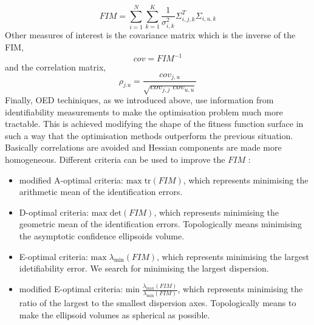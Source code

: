 \documentclass[a4paper, 11pt]{article}
\begin{document}
\begin{equation} \label{FIM}
FIM=\sum_{i=1}^{N}\sum_{k=1}^{K}\frac{1}{\sigma_{i,k}^{2}}\Sigma_{i,j,k}^{T}\Sigma_{i,u,k}
\end{equation}
Other measures of interest is the covariance matrix which is the inverse of the FIM, 
\begin{equation} \label{cov}
  cov=FIM^{-1}
\end{equation}
and the correlation matrix, 
\begin{equation} \label{corr}
  \rho_{j.u}=\frac{cov_{j,u}}{\sqrt{cov_{j,j}\;cov_{u,u}}}
\end{equation}
Finally, OED techiniques, as we introduced above, use information from identifiability measurements to make the optimisation problem much more tractable. 
This is achieved modifying the shape of the fitness function surface in such a way that the optimisation methods outperform the previous situation.
Basically correlations are avoided and Hessian components are made more homogeneous.
Different criteria can be used to improve the $FIM$ \citep{rodriguez-fernandez06}:
\begin{itemize}
  \item modified A-optimal criteria: $\mathrm{max}\;\mathrm{tr}(FIM)$, which represents minimising the arithmetic mean of the identification errors.
  \item D-optimal criteria: $\mathrm{max}\;\mathrm{det}(FIM)$, which represents minimising the geometric mean of the identification errors.
    Topologically means minimising the asymptotic confidence ellipsoids volume.
  \item E-optimal criteria: $\mathrm{max}\;\lambda_{\mathrm{min}}(FIM)$, which represents minimising the largest idetifiability error.
    We search for minimising the largest dispersion.
  \item modified E-optimal criteria: $\mathrm{min}\;\frac{\lambda_{\mathrm{max}}(FIM)}{\lambda_{\mathrm{min}}(FIM)}$, which represents minimising the ratio of the largest to the smallest dispersion axes.
    Topologically means to make the ellipsoid volumes as spherical as possible.
\end{itemize}
\end{document}
